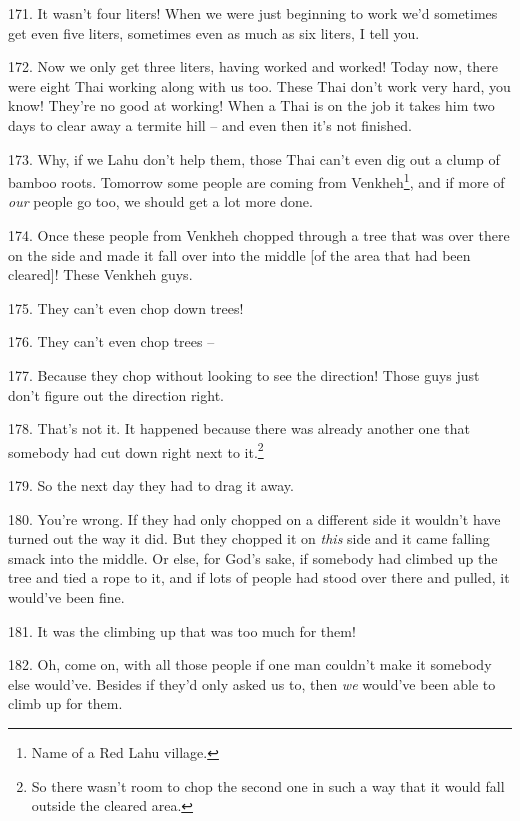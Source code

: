 171. It wasn't four liters! When we were just beginning to work we'd sometimes
get even five liters, sometimes even as much as six liters, I tell you.

172. Now we only get three liters, having worked and worked! Today now, there were
eight Thai working along with us too. These Thai don't work very hard, you know!
They're no good at working! When a Thai is on the job it takes him two days to
clear away a termite hill -- and even then it's not finished.

173. Why, if we Lahu don't help them, those Thai can't even dig out a clump of
bamboo roots. Tomorrow some people are coming from Venkheh\footnote{Name of a Red Lahu village.}, and if more of
\textit{our} people go too, we should get a lot more done.

174. Once these people from Venkheh chopped through a tree that was over there
on the side and made it fall over into the middle [of the area that had been cleared]!
These Venkheh guys.

175. They can't even chop down trees!

176. They can't even chop trees --

177. Because they chop without looking to see the direction! Those guys just don't
figure out the direction right.

178.  That's not it. It happened because there
was already another one that somebody had cut down right next to it.\footnote{So there wasn't room to chop the second one in such a way that it would fall outside the cleared area.}

179. So the next day they had to drag it away.

180. You're wrong. If they had only chopped on a different side it wouldn't have
turned out the way it did. But they chopped it on \textit{this} side 
and it came falling smack into the middle. Or else, for God's sake, if somebody
had climbed up the tree and tied a rope to it, and if lots of people had stood
over there and pulled, it would've been fine.

181. It was the climbing up that was too much for them!

182. Oh, come on, with all those people if one man couldn't make it somebody else
would've. Besides if they'd only asked us to, then \textit{we} would've been able
to climb up for them.

